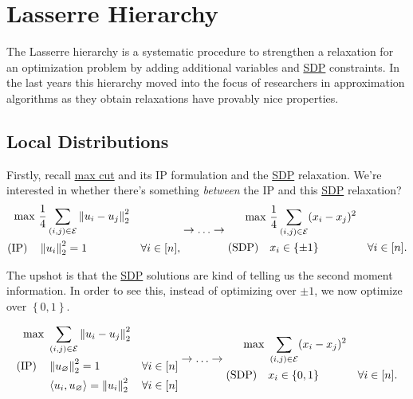 \section{Lasserre Hierarchy}
The Lasserre hierarchy is a systematic procedure to strengthen a relaxation for an optimization problem by adding additional variables and \hyperref[def:SDP]{SDP} constraints. In the last years this hierarchy moved into the focus of researchers in approximation algorithms as they obtain relaxations have provably nice properties.

\subsection{Local Distributions}
Firstly, recall \hyperref[prb:max-cut]{max cut} and its IP formulation and the \hyperref[def:SDP]{SDP} relaxation. We're interested in whether there's something \emph{between} the IP and this \hyperref[def:SDP]{SDP} relaxation?
\[
	\begin{aligned}
		\max~            & \frac{1}{4} \sum_{(i, j)\in \mathcal{\MakeUppercase{e}} } \left\lVert u_i - u_j\right\rVert _2^2                     \\
		(\text{IP})\quad & \left\lVert u_i\right\rVert _2^2 = 1                                                             & \forall i\in [n],
	\end{aligned} \to \ldots \to \begin{aligned}
		\max~             & \frac{1}{4} \sum_{(i, j)\in \mathcal{\MakeUppercase{e}} }  (x_i - x_j)^{2}                     \\
		(\text{SDP})\quad & x_i \in \left\{ \pm 1 \right\}                                             & \forall i\in [n].
	\end{aligned}
\]

The upshot is that the \hyperref[def:SDP]{SDP} solutions are kind of telling us the second moment information. In order to see this, instead of optimizing over \(\pm 1\), we now optimize over \(\left\{ 0, 1 \right\} \).

\[
	\begin{aligned}
		\max~            & \sum_{(i, j)\in \mathcal{\MakeUppercase{e}} } \left\lVert u_i - u_j\right\rVert _2^2                    \\
		(\text{IP})\quad & \left\lVert u_{\varnothing}\right\rVert _2^2 = 1                                     & \forall i\in [n] \\
		                 & \left\langle u_i, u_{\varnothing } \right\rangle = \left\lVert u_i\right\rVert _2^2  & \forall i\in [n]
	\end{aligned} \to \ldots \to \begin{aligned}
		\max~             & \sum_{(i, j)\in \mathcal{\MakeUppercase{e}} }  (x_i - x_j)^{2}                     \\
		(\text{SDP})\quad & x_i \in \left\{ 0, 1 \right\}                                  & \forall i\in [n].
	\end{aligned}
\]

